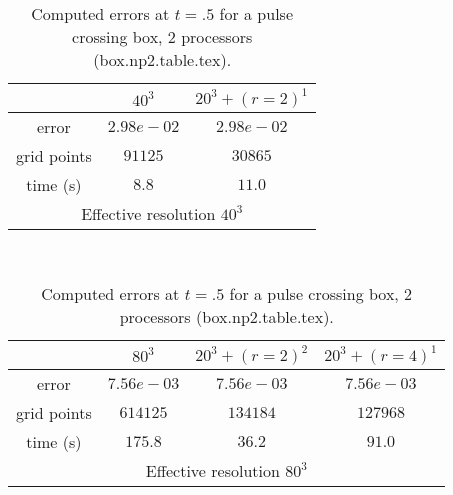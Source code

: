 \begin{table}[hbt]
\footnotesize
\begin{center}
\begin{tabular}{|c|c|c|}  \hline 
            & $40^3$  & $20^3+ (r=2)^1$  \\   \hline 
 error      & $2.98e-02$     & $2.98e-02$  \\  
grid points & $91125$   &   $30865$     \\ 
time (s)    & $8.8$   &  $11.0$      \\ 
 \hline 
 \multicolumn{3}{c}{Effective resolution $40^3$} \\ 
 \end{tabular}  \\ 
\vspace{.25\baselineskip}
\begin{tabular}{|c|c|c|c|}                   \hline 
       &  $80^3$ & $20^3+ (r=2)^2$ & $20^3+ (r=4)^1$  \\   \hline 
 error       & $7.56e-03$      & $7.56e-03$  & $7.56e-03$  \\  
 grid points &  $614125$  &  $134184$      &  $ 127968$      \\ 
 time (s)    &    $175.8$        &   $36.2$           &  $91.0$   \\ 
  \hline 
 \multicolumn{4}{c}{Effective resolution $80^3$}  \\   
 \end{tabular}  
 \end{center}  
 \caption{Computed errors at $t=.5$ for a pulse crossing box, 2 processors (box.np2.table.tex).}  
 \label{tab:amrh.box}  
 \end{table}  
